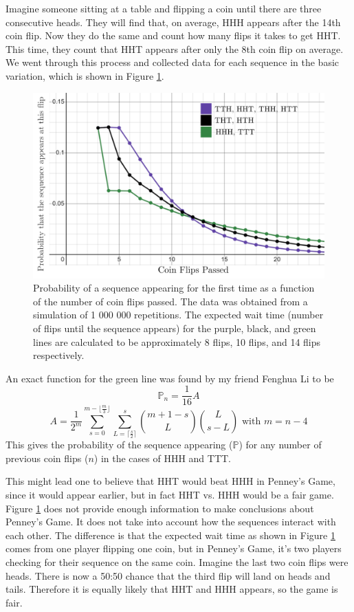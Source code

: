 \documentclass[english,12pt,a4paper,final]{article}
\begin{document}
Imagine someone sitting at a table and flipping a coin until there are three consecutive heads. They will find that, on average, HHH appears after the 14th coin flip. Now they do the same and count how many flips it takes to get HHT. This time, they count that HHT appears after only the 8th coin flip on average. We went through this process and collected data for each sequence in the basic variation, which is shown in Figure \ref{fig:probGraph}.

\newpage

\begin{figure}
	\centering
	\includegraphics[width=0.7\linewidth]{"./prob graph"}
	\caption{Probability of a sequence appearing for the first time as a function of the number of coin flips passed. The data was obtained from a simulation of 1 000 000 repetitions. The expected wait time (number of flips until the sequence appears) for the purple, black, and green lines are calculated to be approximately 8 flips, 10 flips, and 14 flips respectively.}
	\label{fig:probGraph}
\end{figure}

An exact function for the green line was found by my friend Fenghua Li to be 
\begin{equation*}
	\mathbb{P}_n=\frac{1}{16} A
\end{equation*}
\begin{equation*}
	A = \frac{1}{2^m}\sum_{s=0}^{m- \lfloor \frac{m}{3} \rfloor}\sum_{L=\lceil \frac{s}{2} \rceil}^{s} {m+1-s \choose L} {L \choose s-L} \text{ with } m=n-4
\end{equation*}
This gives the probability of the sequence appearing ($\mathbb{P}$) for any number of previous coin flips ($n$) in the cases of HHH and TTT.

This might lead one to believe that HHT would beat HHH in Penney's Game, since it would appear earlier, but in fact HHT vs. HHH would be a fair game. Figure \ref{fig:probGraph} does not provide enough information to make conclusions about Penney's Game. It does not take into account how the sequences interact with each other. The difference is that the expected wait time as shown in Figure \ref{fig:probGraph} comes from one player flipping one coin, but in Penney's Game, it's two players checking for their sequence on the same coin. Imagine the last two coin flips were heads. There is now a 50:50 chance that the third flip will land on heads and tails. Therefore it is equally likely that HHT and HHH appears, so the game is fair.
\end{document}

